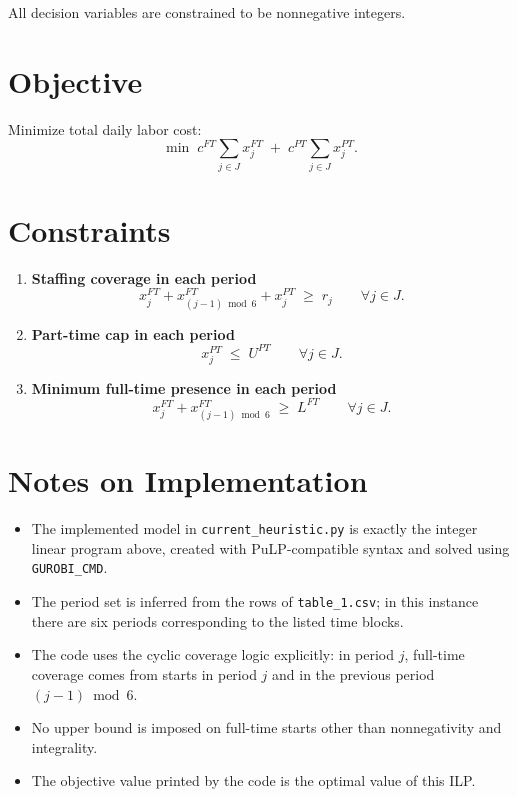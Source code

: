 All decision variables are constrained to be nonnegative integers.

\section*{Objective}

Minimize total daily labor cost:
\[
\min \; c^{FT}\sum_{j \in J} x^{FT}_j \;+\; c^{PT}\sum_{j \in J} x^{PT}_j.
\]

\section*{Constraints}

\begin{enumerate}
    \item \textbf{Staffing coverage in each period}
    \[
    x^{FT}_j + x^{FT}_{(j-1)\bmod 6} + x^{PT}_j \;\ge\; r_j
    \qquad \forall j \in J.
    \]

    \item \textbf{Part-time cap in each period}
    \[
    x^{PT}_j \;\le\; U^{PT}
    \qquad \forall j \in J.
    \]

    \item \textbf{Minimum full-time presence in each period}
    \[
    x^{FT}_j + x^{FT}_{(j-1)\bmod 6} \;\ge\; L^{FT}
    \qquad \forall j \in J.
    \]
\end{enumerate}

\section*{Notes on Implementation}

\begin{itemize}
    \item The implemented model in \texttt{current\_heuristic.py} is exactly the integer linear program above, created with PuLP-compatible syntax and solved using \texttt{GUROBI\_CMD}.
    \item The period set is inferred from the rows of \texttt{table\_1.csv}; in this instance there are six periods corresponding to the listed time blocks.
    \item The code uses the cyclic coverage logic explicitly: in period $j$, full-time coverage comes from starts in period $j$ and in the previous period $(j-1)\bmod 6$.
    \item No upper bound is imposed on full-time starts other than nonnegativity and integrality.
    \item The objective value printed by the code is the optimal value of this ILP.
\end{itemize}
